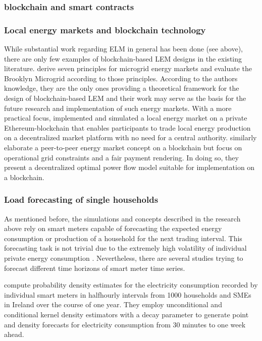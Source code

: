 \subsubsection{blockchain and smart contracts}



\subsubsection{Local energy markets and blockchain technology}
While substantial work regarding ELM in general has been done (see above), there are only few examples of blockchain-based LEM designs in the existing literature. 
\citet{Mengelkamp:2018b} derive seven principles for microgrid energy markets and evaluate the Brooklyn Microgrid according to those principles. According to the authors knowledge, they are the only ones providing a theoretical framework for the design of blockchain-based LEM and their work may serve as the basis for the future research and implementation of such energy markets.
With a more practical focus, \citet{Mengelkamp:2018a} implemented and simulated a local energy market on a private Ethereum-blockchain  that enables participants to trade local energy production on a decentralized market platform with no need for a central authority.
\citet{Münsing:2017} similarly elaborate a peer-to-peer energy market concept on a blockchain but focus on operational grid constraints and a fair payment rendering. In doing so, they present a decentralized optimal power flow model suitable for implementation on a blockchain.


\subsubsection{Load forecasting of single households}
As mentioned before, the simulations and concepts described in the research above rely on smart meters capable of forecasting the expected energy consumption or production of a household for the next trading interval. This forecasting task is not trivial due to the extremely high volatility of individual private energy consumption \citep{Wang:2018}. Nevertheless, there are several studies trying to forecast different time horizons of smart meter time series.

\citet{Arora:2016} compute probability density estimates for the electricity consumption recorded by individual smart meters in halfhourly intervals from 1000 households and SMEs in Ireland over the course of one year. They employ unconditional and conditional kernel density estimators with a decay parameter to generate point and density forecasts for electricity consumption from 30 minutes to one week ahead.

